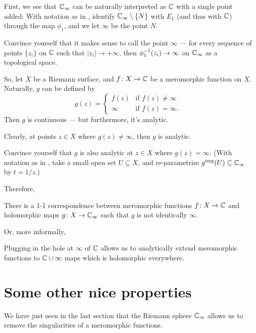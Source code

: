 First, we see that $\mathbb C_\infty$ can be naturally interpreted as $\mathbb C$ with a single point added:
With notation as in , identify $\mathbb C_\infty \setminus \{ N \}$ with $E_1$
(and thus with $\mathbb C$) through the map $\phi_1$, and we let $\infty$ be the point $N$.

\begin{ques}
	Convince yourself that it makes sense to call the point $\infty$ --- for every sequence of
	points $\{ z_i \}$ on $\mathbb C$ such that $|z_i| \to +\infty$, then $\phi_1^{-1}(z_i) \to \infty$
	on $\mathbb C_\infty$ as a topological space.
\end{ques}

So, let $X$ be a Riemann surface, and $f \colon X \to \mathbb C$ be a meromorphic function on $X$.
Naturally, $g$ can be defined by
\[ g(z) = \begin{cases}
	f(z) & \text{if }f(z) \neq \infty \\
	\infty & \text{if }f(z) = \infty.
\end{cases} \]
Then $g$ is continuous --- but furthermore, it's analytic.
\begin{ques}
	Clearly, at points $z \in X$ where $g(z) \neq \infty$, then $g$ is analytic.

	Convince yourself that $g$ is also analytic at $z \in X$ where $g(z) = \infty$.
	(With notation as in ,
	take a small open set $U \subseteq X$,
	and re-parametrize $g^{\text{img}}(U) \subseteq \mathbb C_\infty$ by $t = 1/z$.)
\end{ques}

Therefore,
\begin{proposition}
	There is a 1-1 correspondence between meromorphic functions $f \colon X \to \mathbb C$ and holomorphic
	maps $g \colon X \to \mathbb C_\infty$ such that $g$ is not identically $\infty$.
\end{proposition}
Or, more informally,
\begin{moral}
	Plugging in the hole at $\infty$ of $\mathbb C$ allows us to analytically extend meromorphic functions
	to $\mathbb C \cup \infty$ maps which is holomorphic everywhere.
\end{moral}

\section{Some other nice properties}

We have just seen in the last section that the Riemann sphere $\mathbb C_\infty$ allows us to remove the
singularities of a meromorphic functions.

